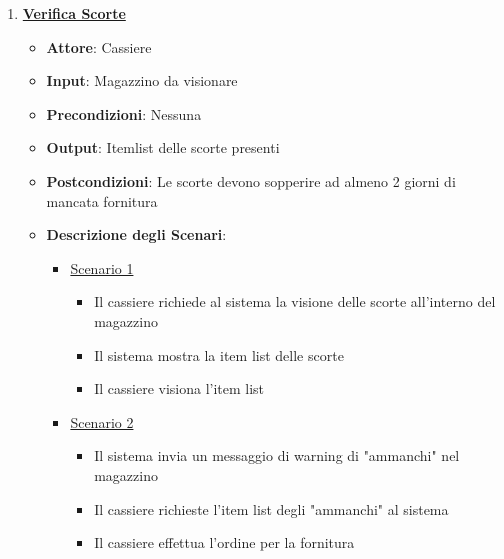 \begin{enumerate}
    \item \uline {{\bf Verifica Scorte}}
    \begin{itemize}
        \item {\bf Attore}: Cassiere
        \item {\bf Input}: Magazzino da visionare
        \item {\bf Precondizioni}: Nessuna
        \item {\bf Output}: Itemlist delle scorte presenti
        \item {\bf Postcondizioni}: Le scorte devono sopperire ad almeno 2 giorni di mancata
            fornitura
        \item {\bf Descrizione degli Scenari}:
        \begin{itemize}
            \item \uline{Scenario 1}
            \begin{itemize}
                \item Il cassiere richiede al sistema la visione delle scorte all'interno del magazzino
                \item Il sistema mostra la item list delle scorte
                \item Il cassiere visiona l'item list
            \end{itemize}
            \item \uline{Scenario 2}
            \begin{itemize}
                \item Il sistema invia un messaggio di warning di "ammanchi" nel magazzino
                \item Il cassiere richieste l'item list degli "ammanchi" al sistema 
                \item Il cassiere effettua l'ordine per la fornitura
            \end{itemize}
        \end{itemize}
    \end{itemize} 

\end{enumerate}
